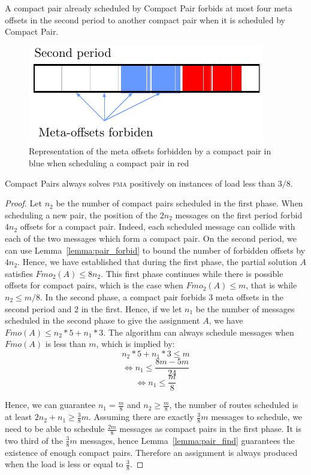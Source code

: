 \documentclass[a4paper,UKenglish,cleveref, autoref, thm-restate]{lipics-v2019}
\newcommand\pma{\textsc{pma}\xspace}
\begin{document}
\begin{lemma}\label{lemma:pair_forbid}
A compact pair already scheduled by Compact Pair forbids at most four meta offsets in the second period to another compact pair when it is scheduled by Compact Pair.
\end{lemma}

\begin{figure}
\begin{center}
\includegraphics[scale=0.7]{pairforbiden}
\end{center}

\caption{Representation of the meta offsets forbidden by a compact pair in blue when scheduling a compact pair in red} 
\label{fig:forbidenmeta}
\end{figure}
\begin{theorem}
Compact Pairs always solves \pma positively on instances of load less than
$3/8$.
\end{theorem}
\begin{proof}
Let $n_2$ be the number of compact pairs scheduled in the first phase. When scheduling a new pair, the position of the $2n_2$ messages on the first period forbid $4n_2$ offsets for a compact pair. Indeed, each scheduled message can collide
with each of the two messages which form a compact pair. On the second period, we can use Lemma~\ref{lemma:pair_forbid} to bound the number of forbidden offsets by $4n_2$. 
Hence, we have established that during the first phase, the partial solution $A$
satisfies $Fmo_2(A) \leq 8n_2$. This first phase continues while there is possible offsets for compact pairs, which is the case when $Fmo_2(A) \leq m$, that is while $n_2 \leq m/8$.
In the second phase, a compact pair forbids $3$ meta offsets in the 
second period and $2$ in the first. Hence, if we let $n_1$ be the number of messages scheduled in the second phase to give the assignment $A$, we have $Fmo(A) \leq n_2*5 + n_1*3$. 
The algorithm can always schedule messages when $Fmo(A)$ is less than $m$, which is implied by:
$$ n_2*5 + n_1*3 \leq m$$
$$\Leftrightarrow n_1 \leq \frac{8m - 5m }{24}$$
$$\Leftrightarrow n_1 \leq \frac{m}{8}$$

Hence, we can guarantee $n_1 = \frac{m}{8}$ and $n_2 \geq \frac{m}{8}$, the number of routes scheduled is at least $2n_2 + n_1 \geq \frac{3}{8}m$. Assuming there are exactly $\frac{3}{8}m$ messages to schedule, we need to be able to schedule $\frac{2m}{8}$ messages as compact pairs in the first phase. It is two third of the $\frac{3}{8}m$ messages, hence Lemma~\ref{lemma:pair_find} guarantees the existence of enough compact pairs. Therefore an assignment is always produced when the load is less or equal to $\frac{3}{8}$.
\end{proof}
\end{document}
